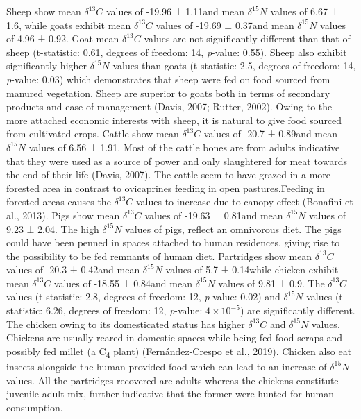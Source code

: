 \documentclass[5p]{elsarticle} %
\begin{document}
Sheep show mean \(\delta ^{13}C\) values of -19.96 ± 1.11\permil and mean \(\delta ^{15}N\) values of 6.67 ± 1.6\permil, while goats exhibit mean \(\delta ^{13}C\) values of -19.69 ± 0.37\permil and mean \(\delta ^{15}N\) values of 4.96 ± 0.92\permil. Goat mean \(\delta ^{13}C\) values are not significantly different than that of sheep (t-statistic: 0.61, degrees of freedom: 14, \emph{p}-value: 0.55). Sheep also exhibit significantly higher \(\delta ^{15}N\) values than goats (t-statistic: 2.5, degrees of freedom: 14, \emph{p}-value: 0.03) which demonstrates that sheep were fed on food sourced from manured vegetation. Sheep are superior to goats both in terms of secondary products and ease of management (Davis, 2007; Rutter, 2002). Owing to the more attached economic interests with sheep, it is natural to give food sourced from cultivated crops.
Cattle show mean \(\delta ^{13}C\) values of -20.7 ± 0.89\permil and mean \(\delta ^{15}N\) values of 6.56 ± 1.91\permil. Most of the cattle bones are from adults indicative that they were used as a source of power and only slaughtered for meat towards the end of their life (Davis, 2007). The cattle seem to have grazed in a more forested area in contrast to ovicaprines feeding in open pastures.Feeding in forested areas causes the \(\delta ^{13}C\) values to increase due to canopy effect (Bonafini et al., 2013). Pigs show mean \(\delta ^{13}C\) values of -19.63 ± 0.81\permil and mean \(\delta ^{15}N\) values of 9.23 ± 2.04\permil. The high \(\delta ^{15}N\) values of pigs, reflect an omnivorous diet. The pigs could have been penned in spaces attached to human residences, giving rise to the possibility to be fed remnants of human diet. Partridges show mean \(\delta ^{13}C\) values of -20.3 ± 0.42\permil and mean \(\delta ^{15}N\) values of 5.7 ± 0.14\permil while chicken exhibit mean \(\delta ^{13}C\) values of -18.55 ± 0.84\permil and mean \(\delta ^{15}N\) values of 9.81 ± 0.9\permil. The \(\delta ^{13}C\) values (t-statistic: 2.8, degrees of freedom: 12, \emph{p}-value: 0.02) and \(\delta ^{15}N\) values (t-statistic: 6.26, degrees of freedom: 12, \emph{p}-value: \ensuremath{4\times 10^{-5}}) are significantly different. The chicken owing to its domesticated status has higher \(\delta ^{13}C\) and \(\delta ^{15}N\) values. Chickens are usually reared in domestic spaces while being fed food scraps and possibly fed millet (a C\textsubscript{4} plant) (Fernández-Crespo et al., 2019). Chicken also eat insects alongside the human provided food which can lead to an increase of \(\delta ^{15}N\) values. All the partridges recovered are adults whereas the chickens constitute juvenile-adult mix, further indicative that the former were hunted for human consumption.
\end{document}
